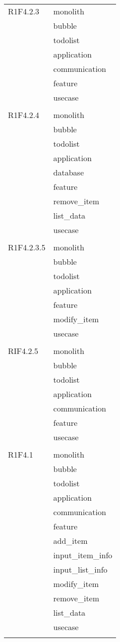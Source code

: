 \begin{center}
\begin{longtable}{|p{7cm}|p{7cm}|}
		R1F4.2.3 & monolith \\ & bubble \\ & todolist \\ & application \\ & communication \\ & feature \\ & usecase \\ & \\ \hline
		R1F4.2.4 & monolith \\ & bubble \\ & todolist \\ & application \\ & database \\ & feature \\ & remove\_item \\ & list\_data \\ & usecase \\ & \\ \hline
		R1F4.2.3.5 & monolith \\ & bubble \\ & todolist \\ & application \\ & feature \\ & modify\_item \\ & usecase \\ & \\ \hline
		RIF4.2.5 & monolith \\ & bubble \\ & todolist \\ & application \\ & communication \\ & feature \\ & usecase \\ & \\ \hline
		R1F4.1 & monolith \\ & bubble \\ & todolist \\ & application \\ & communication \\ & feature \\ & add\_item \\ & input\_item\_info \\ & input\_list\_info \\ & modify\_item \\ & remove\_item \\ & list\_data \\ & usecase \\ & \\ \hline

\end{longtable}
\end{center}
